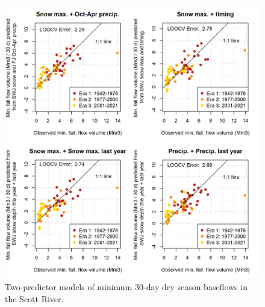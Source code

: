 \documentclass[hess, manuscript]{copernicus}
\begin{document}
\begin{figure}
\includegraphics[width=1\linewidth]{f12} \caption{\label{fig:two_predictor_model} Two-predictor models of minimum 30-day dry season baseflows in the Scott River.}\label{fig:two_predictor_model}
\end{figure}
\end{document}
